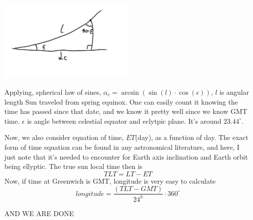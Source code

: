 \documentclass[a4paper,12pt]{article}
\begin{document}
\par
   \centering
    \includegraphics[width=0.5\textwidth]{SUN_RA.jpg}
\par
Applying, spherical law of sines, \(\alpha_c = \arcsin(\sin(l) \cdot \cos(\epsilon))\), \(l\) is angular length Sun traveled from spring equinox. One can easily count it knowing the time has passed since that date, and we know it pretty well since we know GMT time. \(\epsilon\) is angle between celestial equator and eclytpic plane. It's around \(23.44^\circ\).
\par 
\vspace{5mm}
Now, we also consider equation of time, \(ET\)(day), as a function of day. The exact form of time equation can be found in any astronomical literature, and here, I just note that it's needed to encounter for Earth axis inclination and Earth orbit being ellyptic.
The true sun local time then is 
\begin{equation}
TLT = LT - ET
\end{equation}
Now, if time at Greenwich is GMT, longitude is very easy to calculate
\begin{equation}
longitude = \frac{(TLT - GMT)}{24^h} \cdot 360^\circ
\end{equation}

AND WE ARE DONE
\end{document}
